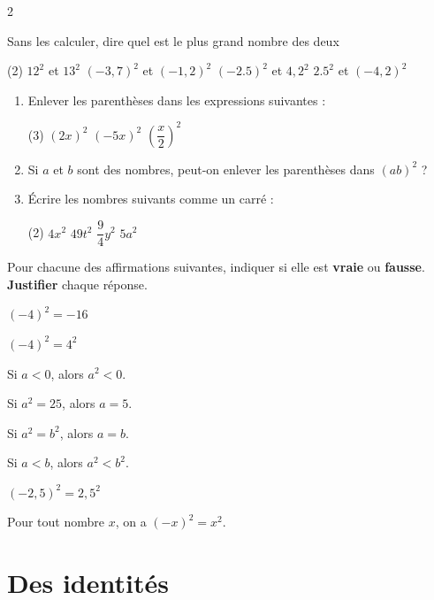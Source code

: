 \documentclass[10pt,a4paper]{article}
\begin{document}
\begin{multicols}{2}
     \begin{exo}
        Sans les calculer, dire quel est le plus grand nombre des deux \begin{tasks}(2)
        \task \(12^2\) et \(13^2\)
        \task \((-3,7)^2\) et \((-1,2)^2\)
        \task \((-2.5)^2\) et \(4,2^2\)
        \task \(2.5^2\) et \((-4,2)^2\)
        \end{tasks}
    \end{exo}

    \begin{exo}[][appro]
        \begin{enumerate}
            \item Enlever les parenthèses dans les expressions suivantes : \begin{tasks}(3)
                \task \((2x)^2\)
                \task \((-5x)^2\)
                \task \(\left(\dfrac{x}{2}\right)^2\)
            \end{tasks}
            \item Si \(a\) et \(b\) sont des nombres, peut-on enlever les parenthèses dans \((ab)^2\) ? 
            \item Écrire les nombres suivants comme un carré : \begin{tasks}(2)
                \task \(4x^2\)
                \task \(49t^2\)
                \task \(\dfrac{9}{4}y^2\)
                \task \(5a^2\)
            \end{tasks}
        \end{enumerate}
    \end{exo}

    \begin{exo}
        
        Pour chacune des affirmations suivantes, indiquer si elle est \textbf{vraie} ou \textbf{fausse}.
        \textbf{Justifier} chaque réponse.

        \begin{tasks}
        \task $(-4)^2=-16$

        \task $(-4)^2=4^2$

        \task Si $a<0$, alors $a^2<0$.

        \task Si $a^2=25$, alors $a=5$.

        \task Si $a^2=b^2$, alors $a=b$.

        \task Si $a<b$, alors $a^2<b^2$.

        \task $(-2,5)^2=2,5^2$

        \task Pour tout nombre $x$, on a $(-x)^2=x^2$.

        \end{tasks}

    \end{exo}

    \section{Des identités}
\end{multicols}
\end{document}
